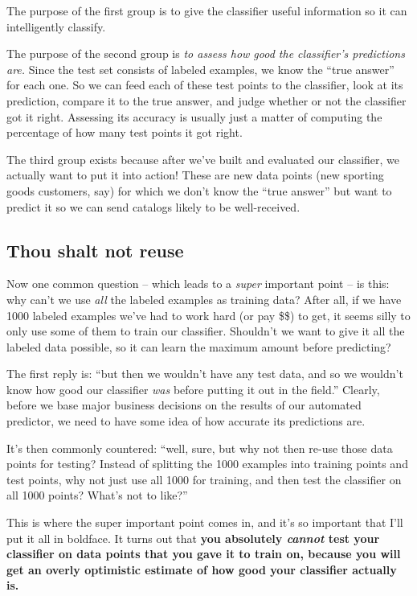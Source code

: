 The purpose of the first group is to give the classifier useful information so
it can intelligently classify.

The purpose of the second group is \textit{to assess how good the classifier's
predictions are.} Since the test set consists of labeled examples, we know the
``true answer'' for each one. So we can feed each of these test points to the
classifier, look at its prediction, compare it to the true answer, and judge
whether or not the classifier got it right. Assessing its accuracy is usually
just a matter of computing the percentage of how many test points it got right.

The third group exists because after we've built and evaluated our classifier,
we actually want to put it into action! These are new data points (new sporting
goods customers, say) for which we don't know the ``true answer'' but want to
predict it so we can send catalogs likely to be well-received.

\subsection{Thou shalt not reuse}

Now one common question -- which leads to a \textit{super} important point --
is this: why can't we use \textit{all} the labeled examples as training data?
After all, if we have 1000 labeled examples we've had to work hard (or pay
\$\$) to get, it seems silly to only use some of them to train our classifier.
Shouldn't we want to give it all the labeled data possible, so it can learn the
maximum amount before predicting?

The first reply is: ``but then we wouldn't have any test data, and so we
wouldn't know how good our classifier \textit{was} before putting it out in the
field.'' Clearly, before we base major business decisions on the results of our
automated predictor, we need to have some idea of how accurate its predictions
are.

It's then commonly countered: ``well, sure, but why not then re-use those data
points for testing? Instead of splitting the 1000 examples into training points
and test points, why not just use all 1000 for training, and then test the
classifier on all 1000 points? What's not to like?''

This is where the super important point comes in, and it's so important that
I'll put it all in boldface. It turns out that \textbf{you absolutely
\textit{cannot} test your classifier on data points that you gave it to train
on, because you will get an overly optimistic estimate of how good your
classifier actually is.}

